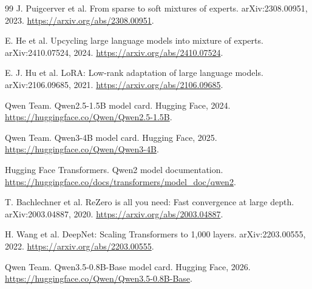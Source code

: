 \documentclass[11pt]{article}
\theoremstyle{definition}
\begin{document}
\begin{thebibliography}{99}
J. Puigcerver et al. From sparse to soft mixtures of experts. arXiv:2308.00951, 2023. \url{https://arxiv.org/abs/2308.00951}.

E. He et al. Upcycling large language models into mixture of experts. arXiv:2410.07524, 2024. \url{https://arxiv.org/abs/2410.07524}.

E. J. Hu et al. LoRA: Low-rank adaptation of large language models. arXiv:2106.09685, 2021. \url{https://arxiv.org/abs/2106.09685}.

Qwen Team. Qwen2.5-1.5B model card. Hugging Face, 2024. \url{https://huggingface.co/Qwen/Qwen2.5-1.5B}.

Qwen Team. Qwen3-4B model card. Hugging Face, 2025. \url{https://huggingface.co/Qwen/Qwen3-4B}.

Hugging Face Transformers. Qwen2 model documentation. \url{https://huggingface.co/docs/transformers/model_doc/qwen2}.


T. Bachlechner et al. ReZero is all you need: Fast convergence at large depth. arXiv:2003.04887, 2020. \url{https://arxiv.org/abs/2003.04887}.

H. Wang et al. DeepNet: Scaling Transformers to 1,000 layers. arXiv:2203.00555, 2022. \url{https://arxiv.org/abs/2203.00555}.

Qwen Team. Qwen3.5-0.8B-Base model card. Hugging Face, 2026. \url{https://huggingface.co/Qwen/Qwen3.5-0.8B-Base}.

\end{thebibliography}
\end{document}
